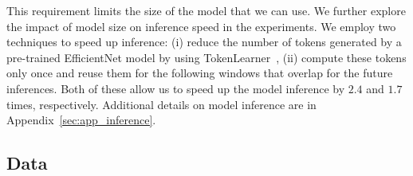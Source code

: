 \documentclass{article} %
\begin{document}
This requirement limits the size of the model that we can use. We further explore the impact of model size on inference speed in the experiments.
We employ two techniques to speed up inference: (i) reduce the number of tokens generated by a pre-trained EfficientNet model by using TokenLearner~\citep{ryoo2021tokenlearner}, (ii) compute these tokens only once and reuse them for the following windows that overlap for the future inferences. Both of these allow us to speed up the model inference by $2.4$ and $1.7$ times, respectively. 
Additional details on model inference are in Appendix~\ref{sec:app_inference}.













\subsection{Data}\label{sec:data}
\end{document}
